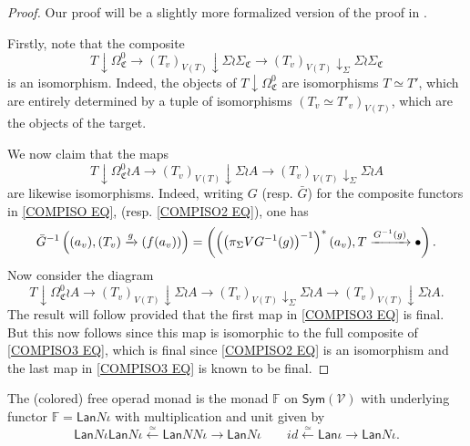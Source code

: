 \documentclass[a4paper,10pt
,draft
]{article}%
\renewcommand{\1}{\eta}%
\begin{document}
\begin{proof}
Our proof will be a slightly more formalized version of the proof in \cite[Lemma 4.28]{BP_geo}.

Firstly, note that the composite
\begin{equation}\label{COMPISO EQ}
T \downarrow \Omega^0_{\mathfrak{C}} 
	\to 
\left( T_v \right)_{V(T)} \downarrow \Sigma \wr \Sigma_{\mathfrak{C}}
	\to
\left( T_v \right)_{V(T)} \downarrow_{\Sigma} \Sigma \wr \Sigma_{\mathfrak{C}}
\end{equation}
is an isomorphism. Indeed, the objects of 
$T \downarrow \Omega^0_{\mathfrak{C}}$
are isomorphisms $T \simeq T'$, which are entirely determined by 
a tuple of isomorphisms $\left(T_v \simeq T'_v\right)_{V(T)}$,
which are the objects of the target. 

We now claim that the maps
\begin{equation}\label{COMPISO2 EQ}
T \downarrow \Omega^0_{\mathfrak{C}} \wr A
	\to 
\left( T_v \right)_{V(T)} \downarrow \Sigma \wr A
	\to
\left( T_v \right)_{V(T)} \downarrow_{\Sigma} \Sigma \wr A
\end{equation}
are likewise isomorphisms.
Indeed, writing $G$ (resp. $\bar{G}$) for the composite functors in \eqref{COMPISO EQ}, (resp. \eqref{COMPISO2 EQ}), one has
\[
\bar{G}^{-1}
\left((a_v), (T_v) \xrightarrow{g} (f(a_v))\right)=
\left(\left(\left(\pi_{\Sigma} V G^{-1}(g)\right)^{-1}\right)^{\**} (a_v),
T \xrightarrow{G^{-1}(g)} \bullet
\right).
\]
Now consider the diagram
\begin{equation}\label{COMPISO3 EQ}
T \downarrow \Omega^0_{\mathfrak{C}} \wr A
	\to 
\left( T_v \right)_{V(T)} \downarrow \Sigma \wr A
	\to
\left( T_v \right)_{V(T)} \downarrow_{\Sigma} \Sigma \wr A
	\to 
\left( T_v \right)_{V(T)} \downarrow \Sigma \wr A.
\end{equation}
The result will follow provided that the first map in \eqref{COMPISO3 EQ} is final. But this now follows since this map is isomorphic to the full composite of \eqref{COMPISO3 EQ}, which is final since \eqref{COMPISO2 EQ} is an isomorphism and the last map in \eqref{COMPISO3 EQ} is known to be final.
\end{proof}



\begin{definition}\label{COLORMON DEF}
The (colored) free operad monad is the monad
$\mathbb{F}$ on $\mathsf{Sym}(\mathcal{V})$
with underlying functor
$\mathbb{F} = \mathsf{Lan} N \iota$ with multiplication and unit given by
\[
	\mathsf{Lan} N \iota \mathsf{Lan} N \iota \xleftarrow{\simeq} 
	\mathsf{Lan} N N \iota \to 
	\mathsf{Lan} N \iota
\qquad
	id \xleftarrow{\simeq} 
	\mathsf{Lan} \iota \to
	\mathsf{Lan} N \iota.
\]
\end{definition}
\end{document}
